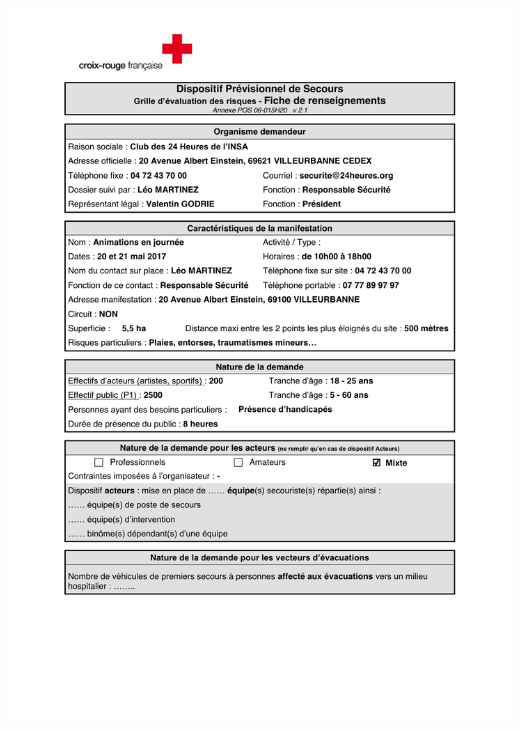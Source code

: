 \documentclass[hidelinks, paper=a4, fontsize=13pt]{report}
\begin{document}
\begin{center}
	\includegraphics[scale=0.70, page=2]{Annexes/Documents/Fiche_RIS_Animations_2017}
\end{center}
\end{document}
